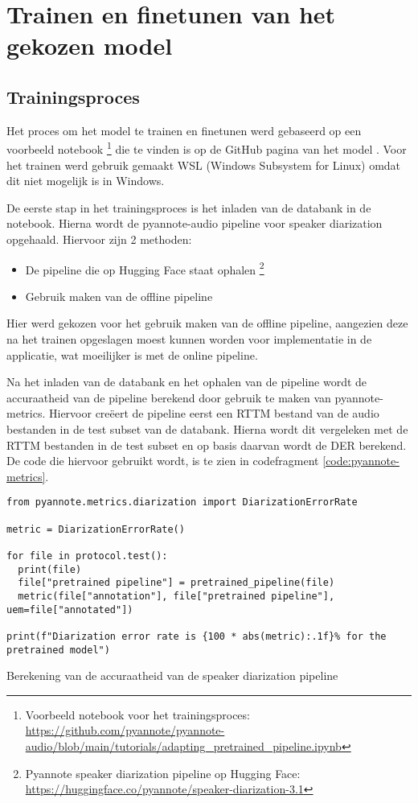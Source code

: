 \section{Trainen en finetunen van het gekozen model}
\label{sec:trainen}

\subsection{Trainingsproces}
\label{subsec:proces}
Het proces om het model te trainen en finetunen werd gebaseerd op een voorbeeld notebook \footnote{Voorbeeld notebook voor het trainingsproces: \url{https://github.com/pyannote/pyannote-audio/blob/main/tutorials/adapting_pretrained_pipeline.ipynb}} die te vinden is op de GitHub pagina van het model \autocite{Bredin2024}. Voor het trainen werd gebruik gemaakt WSL (Windows Subsystem for Linux) omdat dit niet mogelijk is in Windows.

De eerste stap in het trainingsproces is het inladen van de databank in de notebook. Hierna wordt de pyannote-audio pipeline voor speaker diarization opgehaald. Hiervoor zijn 2 methoden:
\begin{itemize}
	\item De pipeline die op Hugging Face staat ophalen \footnote{Pyannote speaker diarization pipeline op Hugging Face: \url{https://huggingface.co/pyannote/speaker-diarization-3.1}}
	\item Gebruik maken van de offline pipeline
\end{itemize}
Hier werd gekozen voor het gebruik maken van de offline pipeline, aangezien deze na het trainen opgeslagen moest kunnen worden voor implementatie in de applicatie, wat moeilijker is met de online pipeline.

Na het inladen van de databank en het ophalen van de pipeline wordt de accuraatheid van de pipeline berekend door gebruik te maken van pyannote-metrics. Hiervoor creëert de pipeline eerst een RTTM bestand van de audio bestanden in de test subset van de databank. Hierna wordt dit vergeleken met de RTTM bestanden in de test subset en op basis daarvan wordt de DER berekend. De code die hiervoor gebruikt wordt, is te zien in codefragment \ref{code:pyannote-metrics}.

\begin{listing}
\begin{verbatim}
from pyannote.metrics.diarization import DiarizationErrorRate

metric = DiarizationErrorRate()

for file in protocol.test():
  print(file)
  file["pretrained pipeline"] = pretrained_pipeline(file)
  metric(file["annotation"], file["pretrained pipeline"], uem=file["annotated"])

print(f"Diarization error rate is {100 * abs(metric):.1f}% for the pretrained model")
\end{verbatim}
	\caption[Berekening DER met pyannote-metrics]{\label{code:pyannote-metrics}Berekening van de accuraatheid van de speaker diarization pipeline}
\end{listing}

